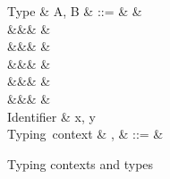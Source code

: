 \begin{figure}[H]
\begin{syntaxfig}
\mbox{Type}
&
A, B
&
::=
&
\tyBool
&
\\
&&&
\tyInt
&
\\
&&&
&
\\
&&&
&
\\
&&&
&
\\
&&&
&
\\[2mm]
\mbox{Identifier}
&
x, y
\\[2mm]
\mbox{Typing context}
&
\Gamma, \Delta
&
::=
&
\end{syntaxfig}
\caption{Typing contexts and types}
\end{figure}
